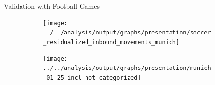 \documentclass[usenames,dvipsnames]{beamer} %
\begin{document}
\begin{frame}{Validation with Football Games}
	\begin{figure}
		\begin{subfigure}[h]{0.44\linewidth}\centering
			\texttt{[image: ../../analysis/output/graphs/presentation/soccer\_residualized\_inbound\_movements\_munich]}
		\end{subfigure}
		\begin{subfigure}[h]{0.54\linewidth}\centering
			\texttt{[image: ../../analysis/output/graphs/presentation/munich\_01\_25\_incl\_not\_categorized]}
		\end{subfigure}
	\end{figure}
\end{frame}






%
%			
%			 
%
%
%
%
%
%	
%
%	
\end{document}
